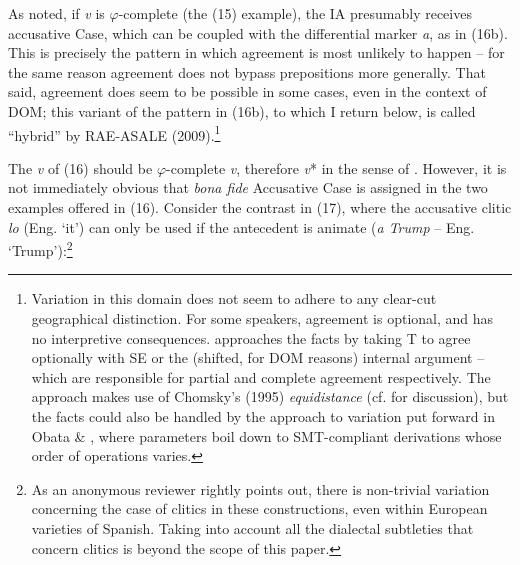 \documentclass[output=paper]{langsci/langscibook}
\begin{document}
As noted, if \textit{v} is $\varphi $-complete (the (15) example), the IA presumably receives accusative Case, which can be coupled with the differential marker \textit{a}, as in (16b). This is precisely the pattern in which agreement is most unlikely to happen – for the same reason agreement does not bypass prepositions more generally. That said, agreement does seem to be possible in some cases, even in the context of DOM; this variant of the pattern in (16b), to which I return below, is called “hybrid” by RAE-ASALE (2009).\footnote{Variation in this domain does not seem to adhere to any clear-cut geographical distinction. For some speakers, agreement is optional, and has no interpretive consequences. \citet{Planells2017} approaches the facts by taking T to agree optionally with SE or the (shifted, for DOM reasons) internal argument – which are responsible for partial and complete agreement respectively. The approach makes use of Chomsky’s (1995) \textit{equidistance} (cf. \citealt{Gallego2013} for discussion), but the facts could also be handled by the approach to variation put forward in Obata \& \citet{Epstein2016}, where parameters boil down to SMT-compliant derivations whose order of operations varies.}

The \textit{v} of (16) should be $\varphi $-complete \textit{v}, therefore \textit{v}* in the sense of \citet{Chomsky2001}. However, it is not immediately obvious that \textit{bona fide} Accusative Case is assigned in the two examples offered in (16). Consider the contrast in (17), where the accusative clitic \textit{lo} (Eng. ‘it’) can only be used if the antecedent is animate (\textit{a Trump} – Eng. ‘Trump’):\footnote{As an anonymous reviewer rightly points out, there is non-trivial variation concerning the case of clitics in these constructions, even within European varieties of Spanish. Taking into account all the dialectal subtleties that concern clitics is beyond the scope of this paper.}

\ea%
    \label{ex:gallego:17}
    \z
\z   
\end{document}
